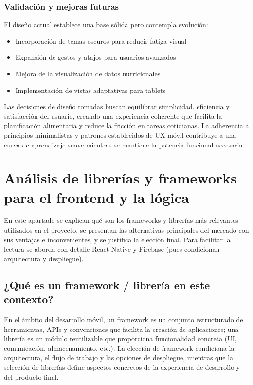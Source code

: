 \documentclass[twoside, openright, 11pt]{report}
\begin{document}
		\subsubsection*{Validación y mejoras futuras}
		El diseño actual establece una base sólida pero contempla evolución:
		
		\begin{itemize}
			\item Incorporación de temas oscuros para reducir fatiga visual
			\item Expansión de gestos y atajos para usuarios avanzados
			\item Mejora de la visualización de datos nutricionales
			\item Implementación de vistas adaptativas para tablets
		\end{itemize}
		
		Las decisiones de diseño tomadas buscan equilibrar simplicidad, eficiencia y satisfacción del usuario, creando una experiencia coherente que facilita la planificación alimentaria y reduce la fricción en tareas cotidianas. La adherencia a principios minimalistas y patrones establecidos de UX móvil contribuye a una curva de aprendizaje suave mientras se mantiene la potencia funcional necesaria.
	\section{Análisis de librerías y frameworks para el frontend y la lógica}
	En este apartado se explican qué son los frameworks y librerías más relevantes utilizados en el proyecto, se presentan las alternativas principales del mercado con sus ventajas e inconvenientes, y se justifica la elección final. Para facilitar la lectura se aborda con detalle React Native y Firebase (pues condicionan arquitectura y despliegue).
	
	\subsection{¿Qué es un framework / librería en este contexto?}
	En el ámbito del desarrollo móvil, un framework es un conjunto estructurado de herramientas, APIs y convenciones que facilita la creación de aplicaciones; una librería es un módulo reutilizable que proporciona funcionalidad concreta (UI, comunicación, almacenamiento, etc.). La elección de framework condiciona la arquitectura, el flujo de trabajo y las opciones de despliegue, mientras que la selección de librerías define aspectos concretos de la experiencia de desarrollo y del producto final.
	
\end{document}

